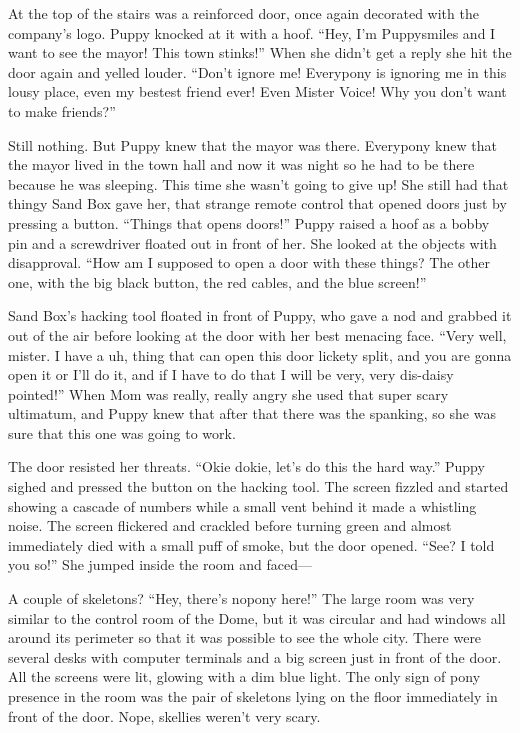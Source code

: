 At the top of the stairs was a reinforced door, once again decorated with the company's logo. Puppy knocked at it with a hoof. ``Hey, I'm Puppysmiles and I want to see the mayor! This town stinks!'' When she didn't get a reply she hit the door again and yelled louder. ``Don't ignore me! Everypony is ignoring me in this lousy place, even my bestest friend ever! Even Mister Voice! Why you don't want to make friends?''

Still nothing. But Puppy knew that the mayor was there. Everypony knew that the mayor lived in the town hall and now it was night so he had to be there because he was sleeping. This time she wasn't going to give up! She still had that thingy Sand Box gave her, that strange remote control that opened doors just by pressing a button. ``Things that opens doors!'' Puppy raised a hoof as a bobby pin and a screwdriver floated out in front of her. She looked at the objects with disapproval. ``How am I supposed to open a door with these things? The other one, with the big black button, the red cables, and the blue screen!''

Sand Box's hacking tool floated in front of Puppy, who gave a nod and grabbed it out of the air before looking at the door with her best menacing face. ``Very well, mister. I have a uh, thing that can open this door lickety split, and you are gonna open it or I'll do it, and if I have to do that I will be very, very dis-daisy pointed!'' When Mom was really, really angry she used that super scary ultimatum, and Puppy knew that after that there was the spanking, so she was sure that this one was going to work.

The door resisted her threats. ``Okie dokie, let's do this the hard way.'' Puppy sighed and pressed the button on the hacking tool. The screen fizzled and started showing a cascade of numbers while a small vent behind it made a whistling noise. The screen flickered and crackled before turning green and almost immediately died with a small puff of smoke, but the door opened. ``See? I told you so!'' She jumped inside the room and faced---

A couple of skeletons? ``Hey, there's nopony here!'' The large room was very similar to the control room of the Dome, but it was circular and had windows all around its perimeter so that it was possible to see the whole city. There were several desks with computer terminals and a big screen just in front of the door. All the screens were lit, glowing with a dim blue light. The only sign of pony presence in the room was the pair of skeletons lying on the floor immediately in front of the door. Nope, skellies weren't very scary.

